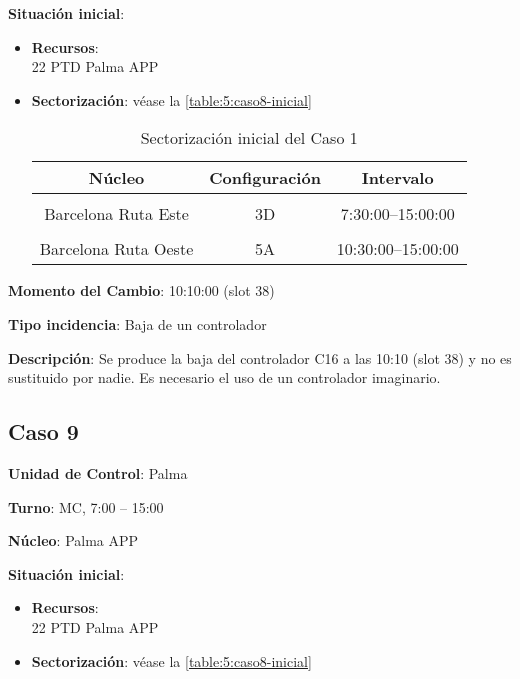 \textbf{Situación inicial}:
\begin{itemize}[label={}]
	
	\item \textbf{Recursos}: \\
	22 PTD Palma APP \\
	
	
	\item \textbf{Sectorización}: véase la \autoref{table:5:caso8-inicial}
	\begin{table}[h]
		\centering
		\caption{Sectorización inicial del Caso 1}
		\begin{tabular}{ccc}
			\hline
			\textbf{Núcleo}      & \textbf{Configuración} & \textbf{Intervalo}   \\ \hline
			\multicolumn{1}{l}{} & \multicolumn{1}{l}{}   & \multicolumn{1}{l}{} \\
			Barcelona Ruta Este  & 3D                     & 7:30:00--15:00:00    \\
			\multicolumn{1}{l}{} & \multicolumn{1}{l}{}   & \multicolumn{1}{l}{} \\
			Barcelona Ruta Oeste & 5A                     & 10:30:00--15:00:00   \\ \hline
		\end{tabular}
		\label{table:5:caso8-inicial}
	\end{table}
	
\end{itemize}

\textbf{Momento del Cambio}: 10:10:00 (slot 38)

\textbf{Tipo incidencia}: Baja de un controlador

\textbf{Descripción}: Se produce la baja del controlador C16 a las 10:10 (slot 38) y no es sustituido por nadie. Es necesario el uso de un controlador imaginario.


\subsection{Caso 9}

\textbf{Unidad de Control}: Palma

\textbf{Turno}: MC, 7:00 -- 15:00

\textbf{Núcleo}: Palma APP

\textbf{Situación inicial}:
\begin{itemize}[label={}]
	
	\item \textbf{Recursos}: \\
	22 PTD Palma APP \\
	
	\item \textbf{Sectorización}: véase la \autoref{table:5:caso8-inicial}
	
\end{itemize}

